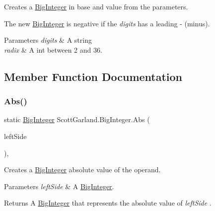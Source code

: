 Creates a \hyperlink{class_scott_garland_1_1_big_integer}{Big\+Integer} in base and value from the parameters. 

The new \hyperlink{class_scott_garland_1_1_big_integer}{Big\+Integer} is negative if the {\itshape digits}  has a leading -\/ (minus). 


\begin{DoxyParams}{Parameters}
{\em digits} & A string\\
\hline
{\em radix} & A int between 2 and 36.\\
\hline
\end{DoxyParams}


\subsection{Member Function Documentation}
\mbox{\label{class_scott_garland_1_1_big_integer_a885dbd49d878ba22013da4efda83545a}} 
\subsubsection{\texorpdfstring{Abs()}{Abs()}}
{\footnotesize\ttfamily static \hyperlink{class_scott_garland_1_1_big_integer}{Big\+Integer} Scott\+Garland.\+Big\+Integer.\+Abs (\begin{DoxyParamCaption}\item[{\hyperlink{class_scott_garland_1_1_big_integer}{Big\+Integer}}]{left\+Side }\end{DoxyParamCaption})\hspace{0.3cm}{\ttfamily [inline]}, {\ttfamily [static]}}



Creates a \hyperlink{class_scott_garland_1_1_big_integer}{Big\+Integer} absolute value of the operand. 


\begin{DoxyParams}{Parameters}
{\em left\+Side} & A \hyperlink{class_scott_garland_1_1_big_integer}{Big\+Integer}.\\
\hline
\end{DoxyParams}
\begin{DoxyReturn}{Returns}
A \hyperlink{class_scott_garland_1_1_big_integer}{Big\+Integer} that represents the absolute value of {\itshape left\+Side} .
\end{DoxyReturn}
\mbox{\label{class_scott_garland_1_1_big_integer_ac2c1dce674b509a0602a4bd8e3fa0e7f}} 
